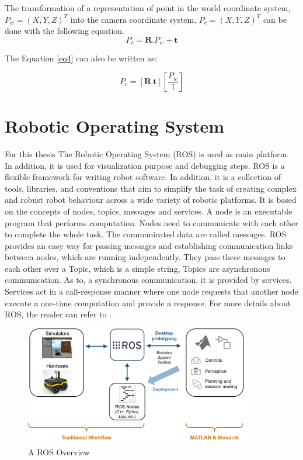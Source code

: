 The transformation of a representation of point in the world coordinate system, $ P_{w}=(X,Y,Z)^{T}$ into the camera coordinate system, $ P_{c}=(X,Y,Z)^{T}$ can be done with the following equation.
\begin{equation}\label{eq4} 
P_{c}=\textbf{R}.P_{w}+\textbf{t}
\end{equation}

 The Equation \ref{eq4} can also be written as:


\begin{equation}\label{eq5} 
    P_{c}=\left[\textbf{R} \ \textbf{t}\right]\left[\frac{P_{w}}{1}\right]   
\end{equation}

\section{Robotic Operating System}

For this thesis The Robotic Operating System (ROS) is used as main platform. In addition, it is used for visualization purpose and debugging steps. ROS is a flexible framework for writing robot software. In addition, it is  a collection of tools, libraries, and conventions that aim to simplify the task of creating complex and robust robot behaviour across a wide variety of robotic platforms. It is based on the concepts of nodes, topics, messages and services. A node is an executable program that performs computation. Nodes need to communicate with each other to complete the whole task. The communicated data are called messages. ROS provides an easy way for passing messages and establishing communication links between nodes, which are running independently. They pass these messages to each other over a Topic, which is a simple string, Topics are asynchronous communication. As to, a synchronous communication, it is provided by services. Services act in a call-response manner where one node requests that another node execute a one-time computation and provide a response. For more details about ROS, the reader can refer to \cite{ros}.

\begin{figure}[!h]
\begin{center}
\includegraphics[width=4in]{figures02/ros_workflows.png}
\caption{A ROS Overview}%
\end{center}
\end{figure}

